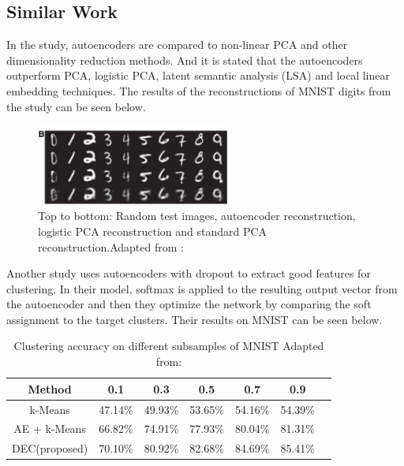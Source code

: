\documentclass[journal]{IEEEtran}
\begin{document}
\subsection{Similar Work}

In the study\cite{hinton2006reducing}, autoencoders are compared to non-linear PCA and other dimensionality reduction methods. And it is stated that the autoencoders outperform PCA, logistic PCA, latent semantic analysis (LSA) and local linear embedding techniques. The results of the reconstructions of MNIST digits from the study can be seen below.

\begin{figure}[!ht]
  \centering
  \includegraphics[width=2.5in]{images/hinton_mnist.png}
  \caption{Top to bottom: Random test images, autoencoder reconstruction, logistic PCA reconstruction and standard PCA reconstruction.\newline Adapted from : \cite{hinton2006reducing}}
  \label{fig_hinton_mnist}
  \end{figure}

  \par

Another study \cite{xie2016unsupervised} uses autoencoders with dropout to extract good features for clustering.
In their model, softmax is applied to the resulting output vector from the autoencoder and then they optimize the network by comparing the soft assignment to the target clusters. Their results on MNIST can be seen below. 

\begin{table}[!ht]
  \renewcommand{\arraystretch}{1.3}
  \caption{Clustering accuracy on different subsamples of MNIST\newline
  Adapted from: \cite{xie2016unsupervised}}
  \label{tab_res_clus}
  \centering
  \begin{tabular}{|c||c|c|c|c|c|c|}
  \hline
   Method  &    0.1 &  0.3 &  0.5 & 0.7 &  0.9  \\
  \hline
  \hline
  k-Means &    47.14\% &   49.93\% &     53.65\%   &    54.16\%  &   54.39\% \\
  \hline
  AE + k-Means & 66.82\% &   74.91\% &     77.93\%   &    80.04\%  &   81.31\% \\
  \hline
  DEC(proposed) &  70.10\% &   80.92\% &     82.68\%   &    84.69\%  &   85.41\% \\
  \hline
  \end{tabular}
  \end{table}
\end{document}
